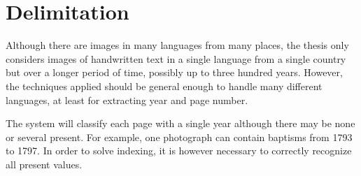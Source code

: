 \section{Delimitation}

Although there are images in many languages from many places, the thesis only considers images of handwritten text in a single language from a single country but over a longer period of time, possibly up to three hundred years.
However, the techniques applied should be general enough to handle many different languages, at least for extracting year and page number.


The system will classify each page with a single year although there may be none or several present. For example, one photograph can contain baptisms from 1793 to 1797. In order to solve indexing, it is however necessary to correctly recognize all present values.
